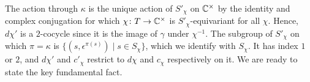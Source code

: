 The action through $\kappa$ is the unique action of $S'_{\chi}$ on ${\mathbb C}^{\times}$ by the identity and complex conjugation for which $\chi \colon T \rightarrow {\mathbb C}^{\times}$ is $S'_{\chi}$-equivariant for all $\chi$. Hence, $d\chi'$ is a $2$-cocycle since it is  the image of $\gamma$ under $\chi^{-1}$. The subgroup of $S'_{\chi}$ on which $\pi = \kappa$ is $\{ (s, \epsilon^{\pi(s)}) \mid s \in S_{\chi} \}$, which we identify with $S_{\chi}$. It has index $1$ or $2$, and $d\chi'$ and $c'_{\chi}$ restrict to $d\chi$ and $c_{\chi}$ respectively on it.
We are ready to state the key fundamental fact.


